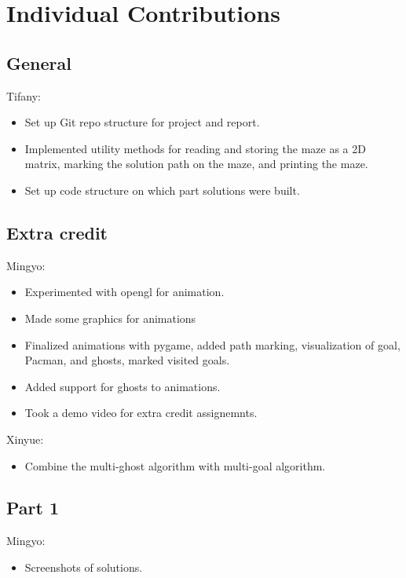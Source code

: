 \section{Individual Contributions}
\subsection*{General}
Tifany:
\begin{itemize}[itemsep=0pt]
  \item Set up Git repo structure for project and report.
  \item Implemented utility methods for reading and storing the maze as a 2D matrix, marking the solution path on the maze, and printing the maze.
  \item Set up code structure on which part solutions were built.
\end{itemize}
\subsection*{Extra credit}
Mingyo:
\begin{itemize}[itemsep=0pt]
  \item Experimented with opengl for animation.
  \item Made some graphics for animations 
  \item Finalized animations with pygame, added path marking, visualization of goal, Pacman, and ghosts, marked visited goals.
  \item Added support for ghosts to animations.
  \item Took a demo video for extra credit assignemnts.
\end{itemize}
Xinyue:
\begin{itemize}[itemsep=0pt]
  \item Combine the multi-ghost algorithm with multi-goal algorithm.
\end{itemize}
\subsection*{Part 1}
Mingyo:
\begin{itemize}[itemsep=0pt]
  \item Screenshots of solutions.
\end{itemize}
